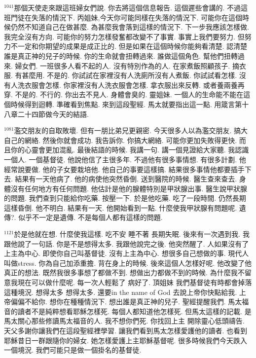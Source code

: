 \documentclass{book}
\begin{document}
$^{1041}$那個天使走來跟這班婦女們說.
你去將這個信息報告.
這個遲些會講的.
不過這班門徒在失落的情況下.
丙姐妹,今天你可能同樣在失落的情況下.
可能你在這個時候仍然不知道自己在做甚麼.
為甚麼我會落到這樣的情況下.
下一步我應該怎樣做.
我完全沒有方向.
可能你的努力怎樣發奮都改變不了事實.
事實上我們要努力.
但努力不一定和你期望的成果是成正比的.
但是如果在這個時候你能夠看清楚.
認清楚誰是真正神的兒子的時候.
你的生命就會扭轉過來.
誰做這個角色.
幫他們扭轉過來.
婦女們.
一班很多人看不起的人.
沒有特別作為的人.
在家煮飯照顧孩子.
摘衣服.
有甚麼用.
不是的.
你試試在家裡沒有人洗廁所沒有人煮飯.
你試試看怎樣.
沒有人洗衣服會怎樣.
你家裡沒有人洗衣服會怎樣.
拿衣服出來反轉.
或者養兩養再穿.
不是的.
不行的.
你出去不見人.
身體會臭的.
靈姐妹.
一個人的生命能不能在這個時候得到迴轉.
準確看到焦點.
來到這段聖經.
馬太就要指出這一點.
用箴言第十八章二十四節做今天的結語.

$^{1081}$濫交朋友的自取敗壞.
但有一朋比弟兄更親密.
今天很多人以為濫交朋友.
搞大自己的網絡.
然後你就會成功.
我告訴你.
你搞大網絡.
可能你更加失敗得更快.
而且你的心靈會更加混亂.
最後結語的時候.
我講一句.
講一個見證給大家聽.
我認識一個人.
一個基督徒.
他說他信了主很多年.
不過他有很多事情想.
有很多計劃.
他經常說要做.
他的子女要栽培他.
他自己的事要這樣搞.
結果很多事情他都要插手下去.
結果有一天他病了.
他的病使他突然昏倒.
送到醫院的時候.
醫生查來查去.
身體沒有任何地方有任何問題.
他估計是他的腺體特別是甲狀腺出事.
醫生說甲狀腺的問題.
我們查到只能給你吃藥.
按壓一下.
於是他吃藥.
吃了一段時間.
仍然長期這樣昏倒.
他不明白.
結果有一天.
他開始看到一點.
什麼使我甲狀腺有問題呢.
遺傳?.
似乎不一定是遺傳.
不是每個人都有這樣的問題.

$^{1121}$於是他就在想.
什麼使我這樣.
吃不安 睡不著 長期失眠.
後來有一次遇到我.
我跟他說了一句話.
你是不是想得太多.
我跟他說完之後.
他突然醒了.
人如果沒有了上主為中心.
即使你自己叫基督徒.
沒有上主為中心.
想很多自己想做的事.
現代人叫做stress.
你為自己加添重擔.
背在身上的時候.
後來這個人怎樣好呢.
他改變了他真正的想法.
既然我很多事想了都做不到.
想做出力都做不到的時候.
為什麼我不留意我現在可以做什麼呢.
每一次人輕鬆了 病好了.
頂姐妹 我們基督徒有時都會掉落這種境況.
想得太多 想得太多.
還要in the name of God 去說上帝你快點給我.
上帝偏偏不給你.
想你在種種情況下.
想出誰是真正神的兒子.
聖經提醒我們.
馬太福音的讀者不是純粹想看耶穌怎樣死.
每個人都知道他怎樣死.
但馬太這樣的記載.
是馬太關心那些修讀馬太福音的人.
我不想你們死.
你找回上主 開除靈心低頭禱告.
天父多謝你讓我們在這段聖經裡學習.
讓我們看到馬太怎樣愛護他的讀者.
也看到耶穌昔日一群跟隨你的婦女.
她怎樣愛護上主耶穌基督呢.
很多時候我們今天跌入一個境況.
我們可能只是做一個掛名的基督徒.
\end{document}
